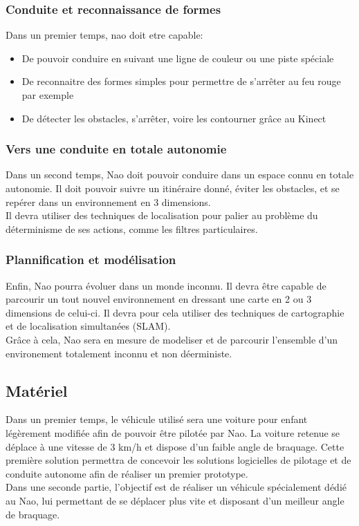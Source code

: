 \documentclass[11pt]{report} %
\begin{document}
			\subsubsection{Conduite et reconnaissance de formes}
				Dans un premier temps, nao doit etre capable:
				\begin{itemize}
				\item De pouvoir conduire en suivant une ligne de couleur ou une piste spéciale
				\item De reconnaitre des formes simples pour permettre de s'arrêter au feu rouge par exemple
				\item De détecter les obstacles, s'arrêter, voire les contourner grâce au Kinect
				\end{itemize}
			\subsubsection{Vers une conduite en totale autonomie}
				Dans un second temps, Nao doit pouvoir conduire dans un espace connu en totale autonomie.
				Il doit pouvoir suivre un itinéraire donné, éviter les obstacles, et se repérer dans un environnement en 3 dimensions.\\
				Il devra utiliser des techniques de localisation pour palier au problème du déterminisme de ses actions, comme les filtres particulaires.
			\subsubsection{Plannification et modélisation}
				Enfin, Nao pourra évoluer dans un monde inconnu. Il devra être capable de parcourir un tout nouvel environnement en dressant une carte en 2 ou 3 dimensions de celui-ci. Il devra pour cela utiliser des techniques de cartographie et de localisation simultanées (SLAM).\\
				Grâce à cela, Nao sera en mesure de modeliser et de parcourir l'ensemble d'un environement totalement inconnu et non déerministe.
		\subsection{Matériel}
			Dans un premier temps, le véhicule utilisé sera une voiture pour enfant légèrement modifiée afin de pouvoir être pilotée par Nao. La voiture retenue se déplace à une vitesse de 3 km/h et dispose d'un faible angle de braquage. Cette première solution permettra de concevoir les solutions logicielles de pilotage et de conduite autonome afin de réaliser un premier prototype.\\
			Dans une seconde partie, l'objectif est de réaliser un véhicule spécialement dédié au Nao, lui permettant de se déplacer plus vite et disposant d'un meilleur angle de braquage.
\end{document}

